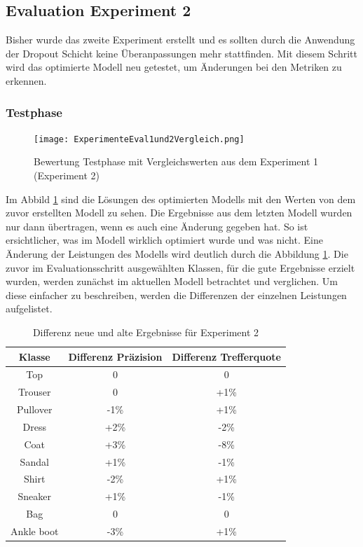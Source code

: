 \documentclass[12pt]{scrreprt}
\begin{document}
\subsection{Evaluation Experiment 2}\label{eval:eval2}

Bisher wurde das zweite Experiment erstellt und es sollten durch die Anwendung der Dropout Schicht keine Überanpassungen mehr stattfinden. Mit diesem Schritt wird das optimierte Modell neu getestet, um Änderungen bei den Metriken zu erkennen.
\subsubsection{Testphase}

\begin{figure}[h!]
	\centering
	\texttt{[image: ExperimenteEval1und2Vergleich.png]}
	\caption{ Bewertung Testphase mit Vergleichswerten aus dem Experiment 1 \cite{HK22}(Experiment 2)}
	\label{fig:fig30}
\end{figure}

Im Abbild \ref{fig:fig30} sind die Lösungen des optimierten Modells mit den Werten von dem zuvor erstellten Modell zu sehen. Die Ergebnisse aus dem letzten Modell wurden nur dann übertragen, wenn es auch eine Änderung gegeben hat. So ist ersichtlicher, was im Modell wirklich optimiert wurde und was nicht. Eine Änderung der Leistungen des Modells wird deutlich durch die Abbildung \ref{fig:fig30}. Die zuvor im Evaluationsschritt ausgewählten Klassen, für die gute Ergebnisse erzielt wurden, werden zunächst im aktuellen Modell betrachtet und verglichen. Um diese einfacher zu beschreiben, werden die Differenzen der einzelnen Leistungen aufgelistet.\\

\begin{table}[h!]
	\begin{center}
		\begin{tabular}{|c|c|c|}
			\hline
			Klasse & Differenz Präzision & Differenz Trefferquote \\
			\hline
			Top  & 0 & 0\\
			\hline
			Trouser  & 0 & +1\%  \\
			\hline
			Pullover   & -1\% & +1\% \\
			\hline
			Dress   & +2\% & -2\% \\
			\hline
			Coat   & +3\% & -8\% \\
			\hline
			Sandal & +1\% & -1\% \\
			\hline
			Shirt & -2\% & +1\% \\
			\hline
			Sneaker & +1\% & -1\% \\
			\hline
			Bag & 0 & 0 \\
			\hline
			Ankle boot & -3\% & +1\% \\
			\hline
		\end{tabular}
		\caption{Differenz neue und alte Ergebnisse für Experiment 2}
		\label{tab:differenz}
	\end{center}
\end{table}
\end{document}
